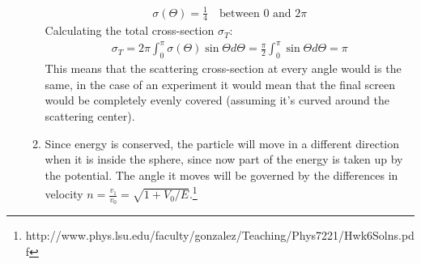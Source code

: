 \documentclass[12pt]{article}
\begin{document}
\begin{enumerate}
\begin{enumerate}
\begin{gather*}
                \sigma(\Theta)=\frac{1}{4}\quad\text{between 0 and 2}\pi
            \end{gather*}
            Calculating the total cross-section $\sigma_T$:
            \begin{gather*}
                \sigma_T=2\pi\int_0^{\pi} \sigma(\Theta)\sin\Theta d\Theta=\frac{\pi}{2}\int_0^{\pi}\sin\Theta d\Theta=\pi
            \end{gather*}
            This means that the scattering cross-section at every angle would is the same, in the case of an experiment it would mean that the final screen would be completely evenly covered (assuming it's curved around the scattering center).
            \item Since energy is conserved, the particle will move in a different direction when it is inside the sphere, since now part of the energy is taken up by the potential.
            The angle it moves will be governed by the differences in velocity $n=\frac{v_1}{v_0}=\sqrt{1+V_0/E}$.\footnote{http://www.phys.lsu.edu/faculty/gonzalez/Teaching/Phys7221/Hwk6Solns.pdf}\\
            \begin{center}
\end{center}
\end{enumerate}
\end{enumerate}
\end{document}
